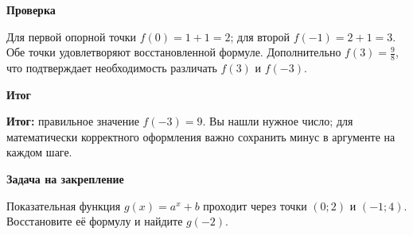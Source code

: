 \documentclass[a4paper,11pt]{article}
\newcommand{\para}[1]{\par\needspace{3\baselineskip}\textbf{#1}\par\nobreak}
\begin{document}
\para{Проверка}
Для первой опорной точки $f(0)=1+1=2$; для второй $f(-1)=2+1=3$. Обе точки удовлетворяют восстановленной формуле. Дополнительно $f(3)=\tfrac98$, что подтверждает необходимость различать $f(3)$ и $f(-3)$.

\para{Итог}
\textcolor{darkaccent}{\textbf{Итог:}} правильное значение $\boxed{f(-3)=9}$. Вы нашли нужное число; для математически корректного оформления важно сохранить минус в аргументе на каждом шаге.

\para{Задача на закрепление}
Показательная функция $g(x)=a^x+b$ проходит через точки $(0;2)$ и $(-1;4)$. Восстановите её формулу и найдите $g(-2)$.
\end{document}
